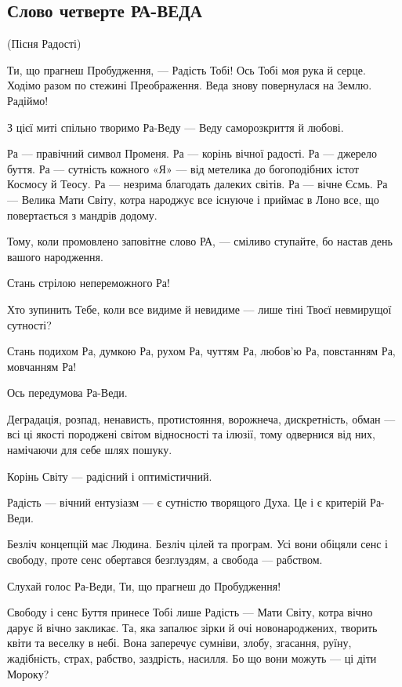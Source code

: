  
 

\subsection{Слово четверте РА-ВЕДА}

(Пісня Радості)

Ти, що прагнеш Пробудження, — Радість Тобі! Ось Тобі моя рука й серце. Ходімо
разом по стежині Преображення. Веда знову повернулася на Землю. Радіймо!

З цієї миті спільно творимо Ра-Веду — Веду саморозкриття й любові.

Ра — правічний символ Променя. Ра — корінь вічної радості. Ра — джерело буття.
Ра — сутність кожного «Я» — від метелика до богоподібних істот Космосу й Теосу.
Ра — незрима благодать далеких світів. Ра — вічне Єсмь. Ра — Велика Мати Світу,
котра народжує все існуюче і приймає в Лоно все, що повертається з мандрів
додому.

Тому, коли промовлено заповітне слово РА, — сміливо ступайте, бо настав день
вашого народження.

Стань стрілою непереможного Ра!

Хто зупинить Тебе, коли все видиме й невидиме — лише тіні Твоєї невмирущої
сутності?

Стань подихом Ра, думкою Ра, рухом Ра, чуттям Ра, любов’ю Ра, повстанням Ра,
мовчанням Ра!

Ось передумова Ра-Веди.

Деградація, розпад, ненависть, протистояння, ворожнеча, дискретність, обман —
всі ці якості породжені світом відносності та ілюзії, тому одвернися від них,
намічаючи для себе шлях пошуку.

Корінь Світу — радісний і оптимістичний.

Радість — вічний ентузіазм — є сутністю творящого Духа. Це і є критерій
Ра-Веди.

Безліч концепцій має Людина. Безліч цілей та програм. Усі вони обіцяли сенс і
свободу, проте сенс обертався безглуздям, а свобода — рабством.

Слухай голос Ра-Веди, Ти, що прагнеш до Пробудження!

Свободу і сенс Буття принесе Тобі лише Радість — Мати Світу, котра вічно дарує
й вічно закликає. Та, яка запалює зірки й очі новонароджених, творить квіти та
веселку в небі. Вона заперечує сумніви, злобу, згасання, руїну, жадібність,
страх, рабство, заздрість, насилля. Бо що вони можуть — ці діти Мороку?

